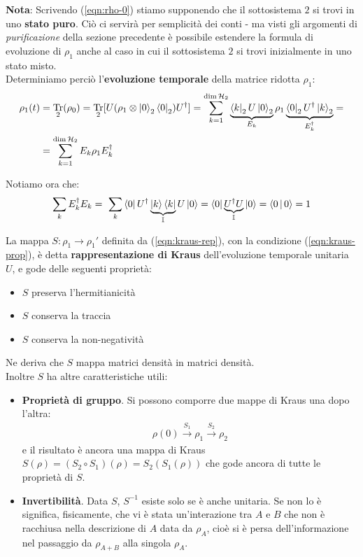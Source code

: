\documentclass[../../InformazioneQuantistica.tex]{subfiles}
\begin{document}
\textbf{Nota}: Scrivendo (\ref{eqn:rho-0}) stiamo supponendo che il sottosistema $2$ si trovi in uno \textbf{stato puro}. Ciò ci servirà per semplicità dei conti - ma visti gli argomenti di \textit{purificazione} della sezione precedente è possibile estendere la formula di evoluzione di $\rho_1$ anche al caso in cui il sottosistema $2$ si trovi inizialmente in uno stato misto.\\


Determiniamo perciò l'\textbf{evoluzione temporale} della matrice ridotta $\rho_1$:
\begin{align}\nonumber
\rho_1(t) &= \underset{2}{\operatorname{Tr}}(\rho_0) = \underset{2}{\operatorname{Tr}} [U(\rho_1 \otimes \Ket{0}_2\Bra{0}_2)U^\dag ] = \sum_{k=1}^{\operatorname{dim}\mathcal{H}_2} \underbrace{\Bra{k}_2U\Ket{0}_2}_{E_k}\rho_1 \underbrace{\Bra{0}_2U^\dag \Ket{k}_2}_{E_k^\dag} = \\
&= \sum_{k=1}^{\operatorname{dim}\mathcal{H}_2} E_k \rho_1 E_k^\dag
\label{eqn:kraus-rep}
\end{align}

Notiamo ora che:
\begin{align}
\sum_k E_k^\dag E_k =\ \sum_k \Bra{0} U^\dag \underbrace{\Ket{k}\Bra{k}}_{\mathbb{I}}U\Ket{0} = \Bra{0} \underbrace{U^\dag U}_{\mathbb{I}} \Ket{0} = \Braket{0|0} = 1
\label{eqn:kraus-prop}
\end{align}

La mappa $S:\rho_1 \to \rho_1'$ definita da (\ref{eqn:kraus-rep}), con la condizione (\ref{eqn:kraus-prop}), è detta \textbf{rappresentazione di Kraus} dell'evoluzione temporale unitaria $U$, e gode delle seguenti proprietà:
\begin{itemize}
\item $S$ preserva l'hermitianicità
\item $S$ conserva la traccia
\item $S$ conserva la non-negatività
\end{itemize}
Ne deriva che $S$ mappa matrici densità in matrici densità.\\

Inoltre $S$ ha altre caratteristiche utili:
\begin{itemize}
\item \textbf{Proprietà di gruppo}. Si possono comporre due mappe di Kraus una dopo l'altra:
\begin{align*}
\rho(0) \xrightarrow{S_1} \rho_1 \xrightarrow{S_2} \rho_2
\end{align*}
e il risultato è ancora una mappa di Kraus $S(\rho) = (S_2 \circ S_1)(\rho) = S_2(S_1(\rho))$ che gode ancora di tutte le proprietà di $S$.
\item \textbf{Invertibilità}. Data $S$, $S^{-1}$ esiste solo se è anche unitaria. Se non lo è significa, fisicamente, che vi è stata un'interazione tra $A$ e $B$ che non è racchiusa nella descrizione di $A$ data da $\rho_A$, cioè si è persa dell'informazione nel passaggio da $\rho_{A+B}$ alla singola $\rho_A$.
\end{itemize}
\end{document}
